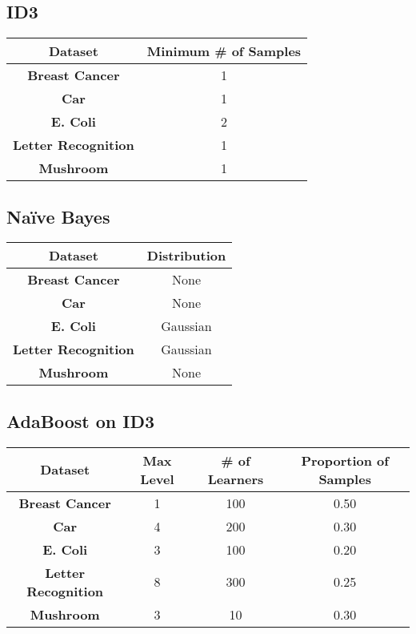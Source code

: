 \documentclass[11pt]{article}
\newcommand{\bb}{\textbf}
\begin{document}
\subsection{ID3}
\begin{tabular}{ |c|c| } \hline
  \bb{Dataset}            & \bb{Minimum \# of Samples} \\ \hline
  \bb{Breast Cancer}      & 1                          \\ \hline
  \bb{Car}                & 1                          \\ \hline
  \bb{E. Coli}            & 2                          \\ \hline
  \bb{Letter Recognition} & 1                          \\ \hline
  \bb{Mushroom}           & 1                          \\ \hline
\end{tabular}


\subsection{Naïve Bayes}
\begin{tabular}{ |c|c| } \hline
  \bb{Dataset}            & \bb{Distribution} \\ \hline
  \bb{Breast Cancer}      & None              \\ \hline
  \bb{Car}                & None              \\ \hline
  \bb{E. Coli}            & Gaussian          \\ \hline
  \bb{Letter Recognition} & Gaussian          \\ \hline
  \bb{Mushroom}           & None              \\ \hline
\end{tabular}

\subsection{AdaBoost on ID3}
\begin{tabular}{ |c|c|c|c| } \hline
  \bb{Dataset}            & \bb{Max Level} & \bb{\# of Learners} & \bb{Proportion of Samples} \\ \hline
  \bb{Breast Cancer}      & 1              & 100                 & 0.50                       \\ \hline
  \bb{Car}                & 4              & 200                 & 0.30                       \\ \hline
  \bb{E. Coli}            & 3              & 100                 & 0.20                       \\ \hline
  \bb{Letter Recognition} & 8              & 300                 & 0.25                       \\ \hline
  \bb{Mushroom}           & 3              & 10                  & 0.30                       \\ \hline
\end{tabular}
\end{document}
